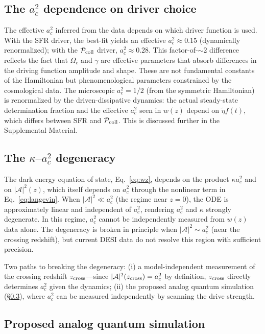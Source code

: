 \documentclass[aps,prd,twocolumn,superscriptaddress]{revtex4-2}
\begin{document}
\subsection{The $a_c^2$ dependence on driver choice}
\label{sec:driver_dependence}

The effective $a_c^2$ inferred from the data depends on which driver function is used. With the SFR driver, the best-fit yields an effective $a_c^2 \approx 0.15$ (dynamically renormalized); with the $\mathcal{P}_{\rm coll}$ driver, $a_c^2 \approx 0.28$. This factor-of-$\sim 2$ difference reflects the fact that $\Omega_c$ and $\gamma$ are effective parameters that absorb differences in the driving function amplitude and shape. These are not fundamental constants of the Hamiltonian but phenomenological parameters constrained by the cosmological data. The microscopic $a_c^2 = 1/2$ (from the symmetric Hamiltonian) is renormalized by the driven-dissipative dynamics: the actual steady-state determination fraction and the effective $a_c^2$ seen in $w(z)$ depend on $\tilde{\eta} f(t)$, which differs between SFR and $\mathcal{P}_{\rm coll}$. This is discussed further in the Supplemental Material.

\subsection{The $\kappa$--$a_c^2$ degeneracy}

The dark energy equation of state, Eq.~\eqref{eq:wz}, depends on the product $\kappa a_c^2$ and on $|\mathcal{A}|^2(z)$, which itself depends on $a_c^2$ through the nonlinear term in Eq.~\eqref{eq:langevin}. When $|\mathcal{A}|^2 \ll a_c^2$ (the regime near $z=0$), the ODE is approximately linear and independent of $a_c^2$, rendering $a_c^2$ and $\kappa$ strongly degenerate. In this regime, $a_c^2$ cannot be independently measured from $w(z)$ data alone. The degeneracy is broken in principle when $|\mathcal{A}|^2 \sim a_c^2$ (near the crossing redshift), but current DESI data do not resolve this region with sufficient precision.

Two paths to breaking the degeneracy: (i) a model-independent measurement of the crossing redshift $z_{\rm cross}$---since $|\mathcal{A}|^2(z_{\rm cross}) = a_c^2$ by definition, $z_{\rm cross}$ directly determines $a_c^2$ given the dynamics; (ii) the proposed analog quantum simulation (\S\ref{sec:quantumsim}), where $a_c^2$ can be measured independently by scanning the drive strength.

\subsection{Proposed analog quantum simulation}
\label{sec:quantumsim}
\end{document}
